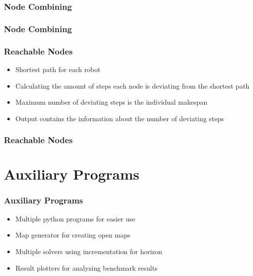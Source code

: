 \documentclass{beamer}
\begin{document}
\begin{frame}
\frametitle{Node Combining}
\begin{figure}[h]
\end{figure}
\end{frame}

\begin{frame}
\frametitle{Node Combining}
\begin{figure}[h]
\end{figure}
\end{frame}

\begin{frame}
\frametitle{Reachable Nodes}
\begin{itemize}
\item<2-> Shortest path for each robot
\medskip
\item<3-> Calculating the amount of steps each node is deviating from the shortest path
\medskip
\item<4-> Maximum number of deviating steps is the individual makespan
\medskip
\item<5-> Output contains the information about the number of deviating steps
\end{itemize}
\end{frame}

\begin{frame}
\frametitle{Reachable Nodes}
\begin{figure}[h]
\end{figure}
\end{frame}

\section{Auxiliary Programs}
\begin{frame}
\frametitle{Auxiliary Programs}
\begin{itemize}
\item<2-> Multiple python programs for easier use
\medskip
\item<3-> Map generator for creating open maps
\medskip
\item<4-> Multiple solvers using incrementation for horizon
\medskip
\item<5-> Result plotters for analyzing benchmark results
\end{itemize}
\end{frame}
\end{document}

